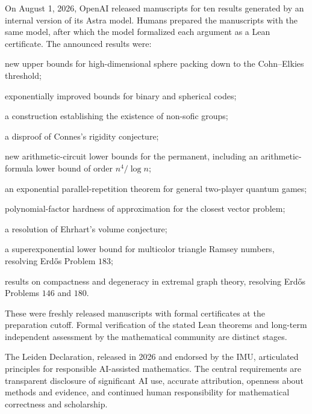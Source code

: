     \begin{fact}
        On August 1, 2026, OpenAI released manuscripts for ten results generated
        by an internal version of its Astra model. Humans prepared the
        manuscripts with the same model, after which the model formalized each
        argument as a Lean certificate. The announced results were:
        \begin{bookitems}
            \item new upper bounds for high-dimensional sphere packing down to
                  the Cohn--Elkies threshold;
            \item exponentially improved bounds for binary and spherical codes;
            \item a construction establishing the existence of non-sofic groups;
            \item a disproof of Connes's rigidity conjecture;
            \item new arithmetic-circuit lower bounds for the permanent,
                  including an arithmetic-formula lower bound of order
                  $n^4/\log n$;
            \item an exponential parallel-repetition theorem for general
                  two-player quantum games;
            \item polynomial-factor hardness of approximation for the closest
                  vector problem;
            \item a resolution of Ehrhart's volume conjecture;
            \item a superexponential lower bound for multicolor triangle Ramsey
                  numbers, resolving Erd\H{o}s Problem $183$;
            \item results on compactness and degeneracy in extremal graph theory,
                  resolving Erd\H{o}s Problems $146$ and $180$.
        \end{bookitems}
        These were freshly released manuscripts with formal certificates at the
        preparation cutoff. Formal verification of the stated Lean theorems and
        long-term independent assessment by the mathematical community are
        distinct stages.
    \end{fact}

    \begin{fact}
        The Leiden Declaration, released in 2026 and endorsed by the IMU,
        articulated principles for responsible AI-assisted mathematics. The
        central requirements are transparent disclosure of significant AI use,
        accurate attribution, openness about methods and evidence, and continued
        human responsibility for mathematical correctness and scholarship.
    \end{fact}

